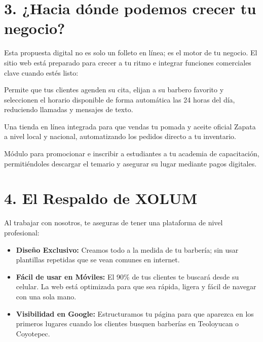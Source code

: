 \documentclass[11pt,a4paper]{article}
\begin{document}
\newpage

\section{3. ¿Hacia dónde podemos crecer tu negocio?}
Esta propuesta digital no es solo un folleto en línea; es el motor de tu negocio. El sitio web está preparado para crecer a tu ritmo e integrar funciones comerciales clave cuando estés listo:

\begin{tarjeta}
    Permite que tus clientes agenden su cita, elijan a su barbero favorito y seleccionen el horario disponible de forma automática las 24 horas del día, reduciendo llamadas y mensajes de texto.
\end{tarjeta}

\begin{tarjeta}
    Una tienda en línea integrada para que vendas tu pomada y aceite oficial Zapata a nivel local y nacional, automatizando los pedidos directo a tu inventario.
\end{tarjeta}

\begin{tarjeta}
    Módulo para promocionar e inscribir a estudiantes a tu academia de capacitación, permitiéndoles descargar el temario y asegurar su lugar mediante pagos digitales.
\end{tarjeta}

\vspace*{0.3cm}

\section{4. El Respaldo de XOLUM}
Al trabajar con nosotros, te aseguras de tener una plataforma de nivel profesional:

\begin{itemize}[label=\color{accentblue}\tiny$\blacksquare$]
    \item \textbf{Diseño Exclusivo:} Creamos todo a la medida de tu barbería; sin usar plantillas repetidas que se vean comunes en internet.
    \item \textbf{Fácil de usar en Móviles:} El 90\% de tus clientes te buscará desde su celular. La web está optimizada para que sea rápida, ligera y fácil de navegar con una sola mano.
    \item \textbf{Visibilidad en Google:} Estructuramos tu página para que aparezca en los primeros lugares cuando los clientes busquen barberías en Teoloyucan o Coyotepec.
\end{itemize}
\end{document}
